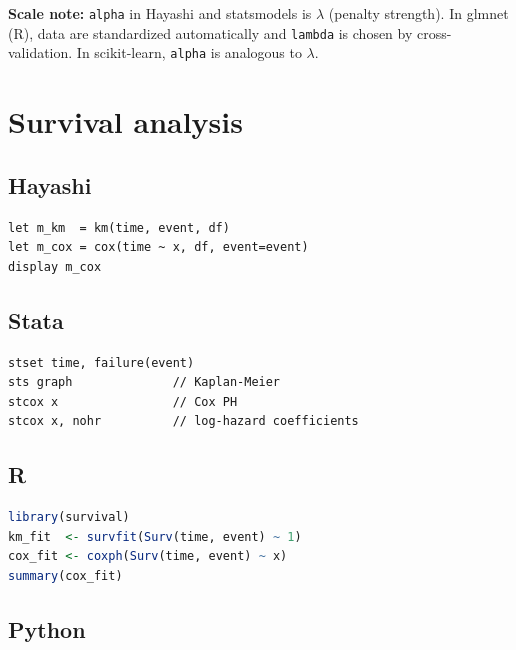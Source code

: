 {\footnotesize \textbf{Scale note:} \texttt{alpha} in Hayashi and statsmodels is $\lambda$
(penalty strength). In glmnet (R), data are standardized automatically
and \texttt{lambda} is chosen by cross-validation. In scikit-learn, \texttt{alpha}
is analogous to $\lambda$.}

\section{Survival analysis}

\subsection*{Hayashi}

\begin{lstlisting}
let m_km  = km(time, event, df)
let m_cox = cox(time ~ x, df, event=event)
display m_cox
\end{lstlisting}

\subsection*{Stata}

\begin{lstlisting}[language={}, basicstyle=\ttfamily\small,
  frame=single, numbers=none, backgroundcolor=\color{codbg}]
stset time, failure(event)
sts graph              // Kaplan-Meier
stcox x                // Cox PH
stcox x, nohr          // log-hazard coefficients
\end{lstlisting}

\subsection*{R}

\begin{lstlisting}[language=R, basicstyle=\ttfamily\small,
  frame=single, numbers=none, backgroundcolor=\color{codbg},
  keywordstyle=\color{keyword}\bfseries,
  stringstyle=\color{string},
  commentstyle=\color{comment}\itshape]
library(survival)
km_fit  <- survfit(Surv(time, event) ~ 1)
cox_fit <- coxph(Surv(time, event) ~ x)
summary(cox_fit)
\end{lstlisting}

\subsection*{Python}

